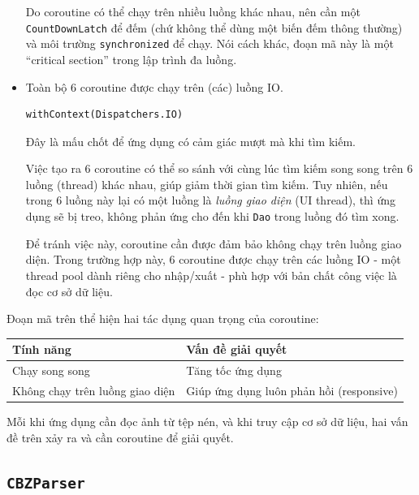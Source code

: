 \documentclass[../../thesis]{subfiles}
\begin{document}
\begin{itemize}
        Do coroutine có thể chạy trên nhiều luồng khác nhau, nên cần một
        \texttt{CountDownLatch} để đếm (chứ không thể dùng một biến đếm thông
        thường) và môi trường \texttt{synchronized} để chạy. Nói cách khác, đoạn
        mã này là một ``critical section'' trong lập trình đa luồng.
    \item
        Toàn bộ 6 coroutine được chạy trên (các) luồng IO.

        \begin{verbatim}
withContext(Dispatchers.IO)
        \end{verbatim}

        Đây là mấu chốt để ứng dụng có cảm giác mượt mà khi tìm kiếm.

        Việc tạo ra 6 coroutine có thể so sánh với cùng lúc tìm kiếm song song
        trên 6 luồng (thread) khác nhau, giúp giảm thời gian tìm kiếm. Tuy
        nhiên, nếu trong 6 luồng này lại có một luồng là \emph{luồng giao diện}
        (UI thread), thì ứng dụng sẽ bị treo, không phản ứng cho đến khi
        \texttt{Dao} trong luồng đó tìm xong.

        Để tránh việc này, coroutine cần được đảm bảo không chạy trên luồng giao
        diện. Trong trường hợp này, 6 coroutine được chạy trên các luồng IO -
        một thread pool dành riêng cho nhập/xuất - phù hợp với bản chất công
        việc là đọc cơ sở dữ liệu.
\end{itemize}

Đoạn mã trên thể hiện hai tác dụng quan trọng của coroutine:

\begin{table}[H]
    \centering
    \begin{tabular}{l l}
        \toprule
        Tính năng      & Vấn đề giải quyết \\
        \midrule
        Chạy song song & Tăng tốc ứng dụng \\
        Không chạy trên luồng giao diện & Giúp ứng dụng luôn phản hồi (responsive) \\
        \bottomrule
    \end{tabular}
\end{table}

Mỗi khi ứng dụng cần đọc ảnh từ tệp nén, và khi truy cập cơ sở dữ liệu,
hai vấn đề trên xảy ra và cần coroutine để giải quyết.

\subsection{\texttt{CBZParser}}
\end{document}
